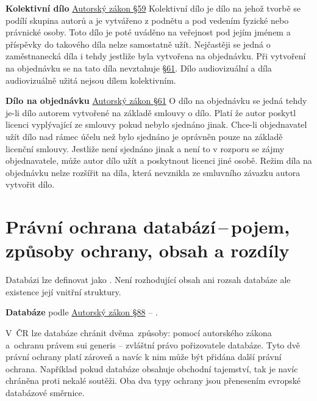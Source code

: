 \vspace{0.3cm}
\textbf{Kolektivní dílo} \href{https://www.zakonyprolidi.cz/cs/2000-121#p59}{Autorský zákon §59}
Kolektivní dílo je dílo na jehož tvorbě se podílí skupina autorů a je vytvářeno z podnětu a pod vedením fyzické nebo právnické osoby. Toto dílo je poté uváděno na veřejnost pod jejím jménem a příspěvky do takového díla nelze samostatně užít. Nejčastěji se jedná o zaměstnanecká díla i tehdy jestliže byla vytvořena na objednávku. Při vytvoření na objednávku se na tato díla nevztahuje \href{https://www.zakonyprolidi.cz/cs/2000-121#p61}{ §61}. Dílo audiovizuální a díla audiovizuálně užitá nejsou dílem kolektivním.

\vspace{0.3cm}
\textbf{Dílo na objednávku} \href{https://www.zakonyprolidi.cz/cs/2000-121#p61}{Autorský zákon §61}
O dílo na objednávku se jedná tehdy je-li dílo autorem vytvořené na základě smlouvy o dílo. Platí že autor poskytl licenci vyplývající ze smlouvy pokud nebylo sjednáno jinak. Chce-li objednavatel užít dílo nad rámec účelu než bylo sjednáno je oprávněn pouze na základě licenční smlouvy. Jestliže není sjednáno jinak a není to v rozporu se zájmy objednavatele, může autor dílo užít a poskytnout licenci jiné osobě. Režim díla na objednávku nelze rozšířit na díla, která nevznikla ze smluvního závazku autora vytvořit dílo.











\newpage
\section{Právní ochrana databází\,--\,pojem, způsoby ochrany, obsah a rozdíly}


Databázi lze definovat jako . Není rozhodující obsah ani rozsah databáze ale existence její vnitřní struktury. 
\vspace{0.2cm}

\textbf{Databáze} podle \href{https://www.zakonyprolidi.cz/cs/2000-121#p88}{Autorský zákon §88} -- .

\vspace{0.3cm}
V~ČR lze databáze chránit dvěma~způsoby: pomocí autorského zákona a~ochranu právem sui generis -- zvláštní právo pořizovatele databáze. Tyto dvě právní ochrany platí zároveň a navíc k nim může být přidána další právní ochrana. Například pokud databáze obsahuje obchodní tajemství, tak je navíc chráněna proti nekalé soutěži. Oba dva typy ochrany jsou přenesením evropské databázové směrnice.

